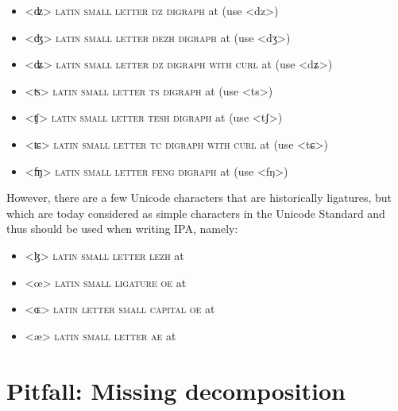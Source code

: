 \begin{itemize} 
	\item[] <ʣ> \textsc{latin small letter dz digraph} at  
	  (use <dz>) 
    \item[] <ʤ> \textsc{latin small letter dezh digraph} at 
      (use <dʒ>)
    \item[] <ʥ> \textsc{latin small letter dz digraph with curl} at 
      (use <dʑ>)
    \item[] <ʦ> \textsc{latin small letter ts digraph} at  
      (use <ts>)
	\item[] <ʧ> \textsc{latin small letter tesh digraph} at  
	  (use <tʃ>) 
    \item[] <ʨ> \textsc{latin small letter tc digraph with curl} at 
      (use <tɕ>)
   	\item[] <ʩ> \textsc{latin small letter feng digraph} at 
	  (use <fŋ>) 
\end{itemize}

However, there are a few Unicode characters that are historically ligatures, but
which are today considered as simple characters in the Unicode Standard and thus
should be used when writing IPA, namely:

\begin{itemize}
	\item[] <ɮ> \textsc{latin small letter lezh} at  
	\item[] <œ> \textsc{latin small ligature oe} at  
	\item[] <ɶ> \textsc{latin letter small capital oe} at  
	\item[] <æ> \textsc{latin small letter ae} at  
\end{itemize}

\section{Pitfall: Missing decomposition}
\label{pitfall-missing-decomposition}

